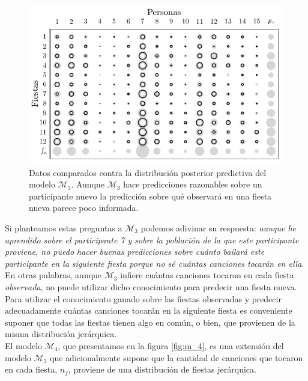 \documentclass{article}
\begin{document}
\begin{figure}[H]
\centering
\setlength\fboxsep{0pt}
\setlength\fboxrule{0.5pt}
\includegraphics[trim=0cm 0cm 0cm 0cm, clip=true, width=1\textwidth]	{data_pos_pred_m3.pdf}
\caption{Datos comparados contra la distribución posterior predictiva del modelo $\mathcal M_3$. Aunque $\mathcal M_3$ hace predicciones razonables sobre un participante nuevo la predicción sobre qué observará en una fiesta nueva parece poco informada.}
\label{fig:data_3}
\end{figure}
	
\indent Si planteamos estas preguntas a $\mathcal M_3$ podemos adivinar su respuesta: \emph{aunque he aprendido sobre el participante 7 y sobre la población de la que este participante proviene, no puedo hacer buenas predicciones sobre cuánto bailará este participante en la siguiente fiesta porque no sé cuántas canciones tocarán en ella}. En otras palabras, aunque $\mathcal M_3$ infiere cuántas canciones tocaron en cada fiesta \emph{observada}, no puede utilizar dicho conocimiento para predecir una fiesta nueva. Para utilizar el conocimiento ganado sobre las fiestas observadas y predecir adecuadamente cuántas canciones tocarán en la siguiente fiesta es conveniente suponer que todas las fiestas tienen algo en común, o bien, que provienen de la misma distribución jerárquica.\\
	
\indent El modelo $\mathcal M_4$, que presentamos en la figura \ref{fig:m_4}, es una extensión del modelo $\mathcal M_3$ que adicionalmente supone que la cantidad de canciones que tocaron en cada fiesta, $n_f$, proviene de una distribución de fiestas jerárquica. \\
\end{document}
